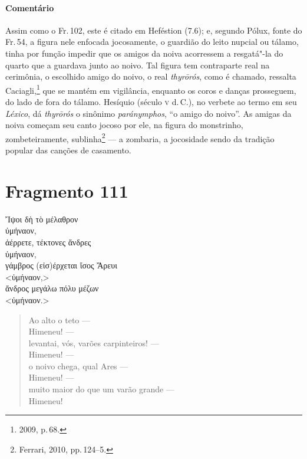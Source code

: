 {\paragraph{Comentário} Assim como o Fr.\,102, este é citado em Heféstion (7.6); e, segundo Pólux, fonte do Fr.\,54, a figura nele enfocada jocosamente, o guardião do leito nupcial ou tálamo, 
tinha por função impedir que os amigos da noiva acorressem a resgatá"-la do
quarto que a guardava junto ao noivo.
Tal figura tem contraparte real na cerimônia, o escolhido amigo do noivo, o real \emph{thyrōrós}, como é chamado, ressalta Caciagli,\footnote{2009, p.\,68.} que se mantém em vigilância, enquanto os coros e danças prosseguem, do lado de fora do tálamo. Hesíquio (século \textsc{v} d.\,C.), no verbete ao termo em seu \emph{Léxico}, dá \emph{thyrōrós} o sinônimo \emph{paránymphos}, ``o amigo do noivo''. As amigas da noiva começam seu canto jocoso por ele, na figura do monstrinho, zombeteiramente, sublinha\footnote{Ferrari, 2010, pp.\,124--5.} --- a zombaria, a jocosidade sendo da tradição popular das canções de casamento.}

\section{Fragmento 111}

\begin{gkverse}
Ἴψοι δὴ τὸ μέλαθρον\\
ὐμήναον,\\
ἀέρρετε, τέκτονες ἄνδρες\\
ὐμήναον,\\
γάμβρος \dagger{}(εἰσ)έρχεται ἴσος Ἄρευι\dagger{}\\
<ὐμήναον,>\\
ἄνδρος μεγάλω πόλυ μέζων\\
<ὐμήναον.>
\end{gkverse}

\begin{verse}
Ao alto o teto --- \\
Himeneu! --- \\
levantai, vós, varões carpinteiros! --- \\
Himeneu! --- \\
o noivo chega, qual Ares --- \\
Himeneu! --- \\ 
muito maior do que um varão grande ---\\
Himeneu!
\end{verse}

\medskip

